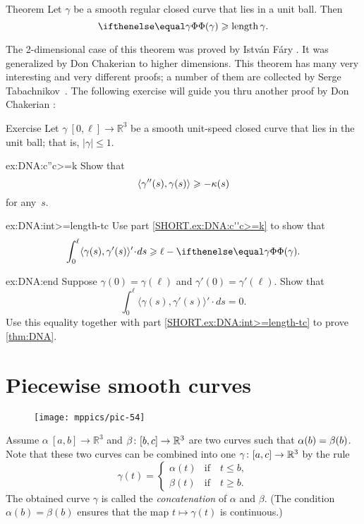 \begin{thm}{Theorem}\label{thm:DNA}
Let $\gamma$ be a smooth regular closed curve that lies in a unit ball.
Then 
\[\tc\gamma\ge \length\gamma.\]

\end{thm}

The 2-dimensional case of this theorem was proved by Istv\'{a}n F\'{a}ry \cite{fary1950}.
It was generalized by Don Chakerian \cite{chakerian1962} to higher dimensions.
This theorem has many very interesting and very different proofs;
a number of them are collected by Serge Tabachnikov~\cite{tabachnikov}.
The following exercise will guide you thru another proof by Don Chakerian \cite{chakerian1964}:

\begin{thm}{Exercise}\label{ex:DNA}
Let $\gamma\:[0,\ell]\to\mathbb{R}^3$ be a smooth unit-speed closed curve that lies in the unit ball; that is, $|\gamma|\le 1$.

\begin{subthm}{ex:DNA:c''c>=k}
Show that 
\[\langle\gamma''(s),\gamma(s)\rangle\geqslant-\kappa(s)\]
for any~$s$.
\end{subthm}

\begin{subthm}{ex:DNA:int>=length-tc}
Use part \ref{SHORT.ex:DNA:c''c>=k} to show that 
\[\int_0^\ell\langle\gamma(s),\gamma'(s)\rangle'\cdot ds\ge
\ell-\tc\gamma.\]

\end{subthm}

\begin{subthm}{ex:DNA:end}
Suppose $\gamma(0)=\gamma(\ell)$ and $\gamma'(0)=\gamma'(\ell)$.
Show that 
\[\int_0^\ell\langle\gamma(s),\gamma'(s)\rangle'\cdot ds=0.\]
Use this equality together with  part \ref{SHORT.ex:DNA:int>=length-tc} to prove \ref{thm:DNA}.
\end{subthm}
\end{thm}

\section{Piecewise smooth curves}

\begin{wrapfigure}{o}{25 mm}
\vskip-0mm
\centering
\texttt{[image: mppics/pic-54]}
\end{wrapfigure}

Assume $\alpha\:[a,b]\to \mathbb{R}^3$ and $\beta\:[b,c]\z\to \mathbb{R}^3$ are two curves such that $\alpha(b)\z=\beta(b)$.
Note that these two curves can be combined into one $\gamma\:[a,c]\z\to \mathbb{R}^3$ by the rule 
\[\gamma(t)=
\begin{cases}
\alpha(t)&\text{if}\quad t\le b,
\\
\beta(t)&\text{if}\quad t\ge b.
\end{cases}
\]
The obtained curve $\gamma$ is called the 
\emph{concatenation} of $\alpha$ and $\beta$.
(The condition $\alpha(b)=\beta(b)$ ensures that the map $t\mapsto\gamma(t)$ is continuous.)

